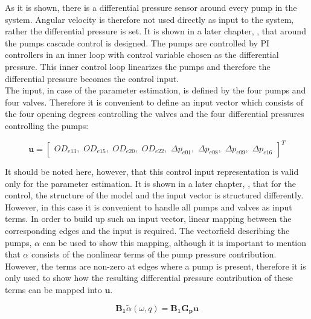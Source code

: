 As it is shown, there is a differential pressure sensor around every pump in the system. Angular velocity is therefore not used directly as input to the system, rather the differential pressure is set. It is shown in a later chapter, , that around the pumps cascade control is designed. The pumps are controlled by PI controllers in an inner loop with control variable chosen as the differential pressure. This inner control loop linearizes the pumps and therefore the differential pressure becomes the control input. 
\\
The input, in case of the parameter estimation, is defined by the four pumps and four valves. Therefore it is convenient to define an input vector which consists of the four opening degrees controlling the valves and the four differential pressures controlling the pumps: 

\begin{equation}
\bm{u} =
\begin{bmatrix} 
OD_{e13},\hspace{4pt} 
OD_{e15},\hspace{4pt} 
OD_{e20},\hspace{4pt} 
OD_{e22},\hspace{4pt} 
\Delta p_{e01},\hspace{4pt} 
\Delta p_{e08},\hspace{4pt} 
\Delta p_{e09},\hspace{4pt} 
\Delta p_{e16} 
\label{inputvector}
\end{bmatrix} ^T
\end{equation}

It should be noted here, however, that this control input representation is valid only for the parameter estimation. It is shown in a later chapter, , that for the control, the structure of the model and the input vector is structured differently. However, in this case it is convenient to handle all pumps and valves as input terms. In order to build up such an input vector, linear mapping between the corresponding edges and the input is required. The vectorfield describing the pumps, $\alpha$ can be used to show this mapping, although it is important to mention that $\alpha$ consists of the nonlinear terms of the pump pressure contribution. However, the terms are non-zero at edges where a pump is present, therefore it is only used to show how the resulting differential pressure contribution of these terms can be mapped into $\bm{u}$.

\begin{equation}
\bm{B_1} \tilde{\alpha}(\omega, q) = \bm{B_1} \bm{G_p} \bm{u}
\label{gamma_lin}
\end{equation}

